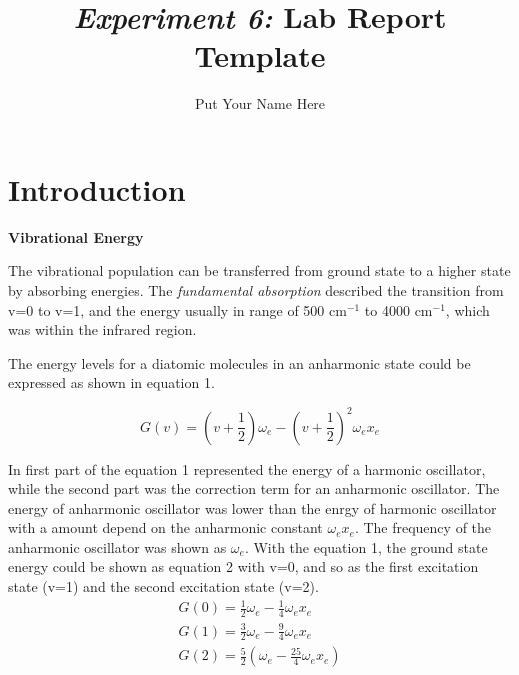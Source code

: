 \documentclass[twocolumn]{article} %
\title{\textit{Experiment 6:} Lab Report Template} %
\author{Put Your Name Here}
\begin{document}


\section{Introduction} %

\textbf{Vibrational Energy}

The vibrational population can be transferred from ground state to a higher state by absorbing energies. The \textit{fundamental absorption} described the transition from v=0 to v=1, and the energy usually in range of 500 cm$^{-1}$ to 4000 cm$^{-1}$, which was within the infrared region. 

The energy levels for a diatomic molecules in an anharmonic state could be expressed as shown in equation 1.

\begin{equation}
    G(v) = (v + \frac{1}{2}) \omega_e - (v + \frac{1}{2})^2\omega_ex_e \label{eq.1}
\end{equation}

In first part of the equation 1 represented the energy of a harmonic oscillator, while the second part was the correction term for an anharmonic oscillator. The energy of anharmonic oscillator was lower than the enrgy of harmonic oscillator with a amount depend on the anharmonic constant $\omega_ex_e$. The frequency of the anharmonic oscillator was shown as $\omega_e$. With the equation 1, the ground state energy could be shown as equation 2 with v=0, and so as the first excitation state (v=1) and the second excitation state (v=2).
\begin{subequations}
    \begin{align}
        G(0) = \frac{1}{2}\omega_e - \frac{1}{4}\omega_ex_e \\
        G(1) = \frac{3}{2}\omega_e - \frac{9}{4}\omega_ex_e \\
        G(2) = \frac{5}{2}(\omega_e -\frac{25}{4}\omega_ex_e) 
    \end{align}
\end{subequations}
\end{document}

